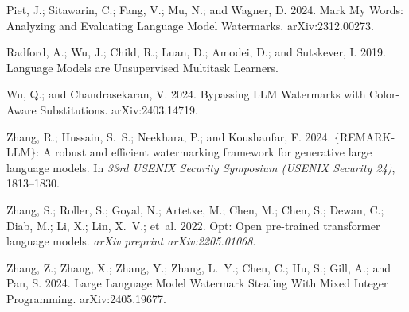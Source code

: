 \documentclass[letterpaper]{article}
\begin{document}
\begin{thebibliography}{14}
Piet, J.; Sitawarin, C.; Fang, V.; Mu, N.; and Wagner, D. 2024.
\newblock Mark My Words: Analyzing and Evaluating Language Model Watermarks.
\newblock arXiv:2312.00273.

Radford, A.; Wu, J.; Child, R.; Luan, D.; Amodei, D.; and Sutskever, I. 2019.
\newblock Language Models are Unsupervised Multitask Learners.

Wu, Q.; and Chandrasekaran, V. 2024.
\newblock Bypassing LLM Watermarks with Color-Aware Substitutions.
\newblock arXiv:2403.14719.

Zhang, R.; Hussain, S.~S.; Neekhara, P.; and Koushanfar, F. 2024{}.
\newblock $\{$REMARK-LLM$\}$: A robust and efficient watermarking framework for
  generative large language models.
\newblock In \emph{33rd USENIX Security Symposium (USENIX Security 24)},
  1813--1830.

Zhang, S.; Roller, S.; Goyal, N.; Artetxe, M.; Chen, M.; Chen, S.; Dewan, C.;
  Diab, M.; Li, X.; Lin, X.~V.; et~al. 2022.
\newblock Opt: Open pre-trained transformer language models.
\newblock \emph{arXiv preprint arXiv:2205.01068}.

Zhang, Z.; Zhang, X.; Zhang, Y.; Zhang, L.~Y.; Chen, C.; Hu, S.; Gill, A.; and
  Pan, S. 2024{}.
\newblock Large Language Model Watermark Stealing With Mixed Integer
  Programming.
\newblock arXiv:2405.19677.

\end{thebibliography}


%
\appendix
%
%
%
%
\end{document}
